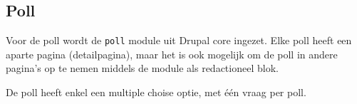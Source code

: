 \subsection{Poll}

Voor de poll wordt de \texttt{poll} module uit Drupal core ingezet.
Elke poll heeft een aparte pagina (detailpagina), maar het is ook mogelijk om de poll in andere pagina's op te nemen middels de  module als redactioneel blok.

De poll heeft enkel een multiple choise optie, met \'{e}\'{e}n vraag per poll.
